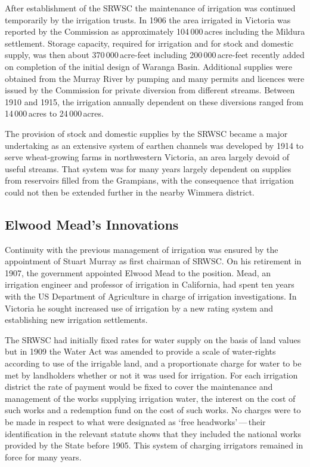 After establishment of the SRWSC the maintenance of irrigation was
continued temporarily by the irrigation trusts.  In 1906 the area
irrigated in Victoria was reported by the Commission as approximately
104\,000\,acres including the Mildura settlement.  Storage capacity, required for irrigation and for stock and
domestic supply, was then about 370\,000\,acre-feet including
200\,000\,acre-feet recently added on completion of the initial design
of Waranga Basin.  Additional supplies were obtained from the Murray
River by pumping and many permits and licences were issued by the
Commission for private diversion from different streams.  Between 1910
and 1915, the irrigation annually dependent on these diversions ranged
from 14\,000\,acres to 24\,000\,acres.

The provision of stock and domestic supplies by the SRWSC became a
major undertaking as an extensive system of earthen channels was
developed by 1914 to serve wheat-growing farms in northwestern
Victoria, an area largely devoid of useful streams. That system was
for many years largely dependent on supplies from reservoirs filled
from the Grampians, with the consequence that irrigation could not
then be extended further in the nearby Wimmera
district.

\subsection*{Elwood Mead's Innovations}

Continuity with the previous management of irrigation was ensured by
the appointment of Stuart Murray  as first chairman
of SRWSC.  On his retirement in 1907, the government appointed Elwood
Mead to the position.  Mead, an irrigation engineer and professor of
irrigation in California, had spent ten years with the US Department
of Agriculture in charge of irrigation investigations.  In Victoria he
sought increased use of irrigation by a new rating system and
establishing new irrigation settlements.

The SRWSC had initially fixed rates for water supply on the basis of
land values but in 1909 the Water Act was amended to provide a scale
of water-rights according to use of the irrigable land, and a
proportionate charge for water to be met by landholders whether or not
it was used for irrigation.  For each irrigation district the rate of
payment would be fixed to cover the maintenance and management of the
works supplying irrigation water, the interest on the cost of such
works and a redemption fund on the cost of such works.  No charges
were to be made in respect to what were designated as `free
headworks'\,---\,their identification in the relevant statute shows that
they included the national works provided by the State before 1905.
This system of charging irrigators remained in force for many
years.

